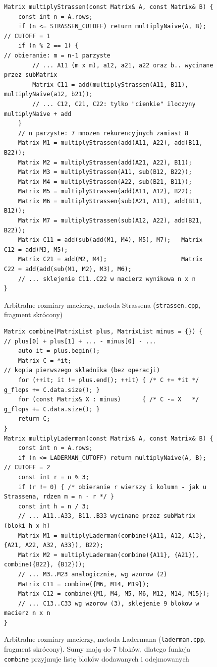\documentclass[11pt,a4paper]{article}
\begin{document}
\begin{figure}[H]
\centering
\begin{lstlisting}
Matrix multiplyStrassen(const Matrix& A, const Matrix& B) {
    const int n = A.rows;
    if (n <= STRASSEN_CUTOFF) return multiplyNaive(A, B);   // CUTOFF = 1
    if (n % 2 == 1) {                                        // obieranie: m = n-1 parzyste
        // ... A11 (m x m), a12, a21, a22 oraz b.. wycinane przez subMatrix
        Matrix C11 = add(multiplyStrassen(A11, B11), multiplyNaive(a12, b21));
        // ... C12, C21, C22: tylko "cienkie" iloczyny multiplyNaive + add
    }
    // n parzyste: 7 mnozen rekurencyjnych zamiast 8
    Matrix M1 = multiplyStrassen(add(A11, A22), add(B11, B22));
    Matrix M2 = multiplyStrassen(add(A21, A22), B11);
    Matrix M3 = multiplyStrassen(A11, sub(B12, B22));
    Matrix M4 = multiplyStrassen(A22, sub(B21, B11));
    Matrix M5 = multiplyStrassen(add(A11, A12), B22);
    Matrix M6 = multiplyStrassen(sub(A21, A11), add(B11, B12));
    Matrix M7 = multiplyStrassen(sub(A12, A22), add(B21, B22));
    Matrix C11 = add(sub(add(M1, M4), M5), M7);   Matrix C12 = add(M3, M5);
    Matrix C21 = add(M2, M4);                     Matrix C22 = add(add(sub(M1, M2), M3), M6);
    // ... sklejenie C11..C22 w macierz wynikowa n x n
}
\end{lstlisting}
\caption{Arbitralne rozmiary macierzy, metoda Strassena (\texttt{strassen.cpp}, fragment skrócony)}
\end{figure}

\begin{figure}[H]
\centering
\begin{lstlisting}
Matrix combine(MatrixList plus, MatrixList minus = {}) {  // plus[0] + plus[1] + ... - minus[0] - ...
    auto it = plus.begin();
    Matrix C = *it;                                        // kopia pierwszego skladnika (bez operacji)
    for (++it; it != plus.end(); ++it) { /* C += *it */ g_flops += C.data.size(); }
    for (const Matrix& X : minus)      { /* C -= X   */ g_flops += C.data.size(); }
    return C;
}
Matrix multiplyLaderman(const Matrix& A, const Matrix& B) {
    const int n = A.rows;
    if (n <= LADERMAN_CUTOFF) return multiplyNaive(A, B);    // CUTOFF = 2
    const int r = n % 3;
    if (r != 0) { /* obieranie r wierszy i kolumn - jak u Strassena, rdzen m = n - r */ }
    const int h = n / 3;
    // ... A11..A33, B11..B33 wycinane przez subMatrix (bloki h x h)
    Matrix M1 = multiplyLaderman(combine({A11, A12, A13}, {A21, A22, A32, A33}), B22);
    Matrix M2 = multiplyLaderman(combine({A11}, {A21}), combine({B22}, {B12}));
    // ... M3..M23 analogicznie, wg wzorow (2)
    Matrix C11 = combine({M6, M14, M19});
    Matrix C12 = combine({M1, M4, M5, M6, M12, M14, M15});
    // ... C13..C33 wg wzorow (3), sklejenie 9 blokow w macierz n x n
}
\end{lstlisting}
\caption{Arbitralne rozmiary macierzy, metoda Ladermana (\texttt{laderman.cpp}, fragment skrócony). Sumy mają do
7 bloków, dlatego funkcja \texttt{combine} przyjmuje listę bloków dodawanych i odejmowanych}
\end{figure}
\end{document}
